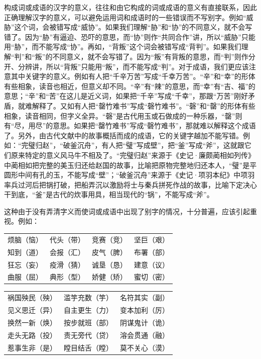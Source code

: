 构成词或成语的汉字的意义，往往和由它构成的词或成语的意义有直接联系，因此正确理解汉字的意义，可以避免运用词和成语时的一些错误而不写别字。例如“威胁”这个词，会被错写成“威协”。如果我们理解“胁”和“协”的不同意义，就不会写错了。因为“胁”有逼迫、恐吓的意思，而“协”则作“共同合作”讲，所以“威胁”只能用“胁”，而不能写成“协”。再如，“背叛”这个词会被错写成“背判”。如果我们理解“判”和“叛”的不同意义，就不会写错了。因为“叛”有背叛的意思，而“判”则作分开、分辨讲，所以“背叛”只能用“叛”，而不能写成“判”。对于成语，我们更应该注意其中关键字的意义。例如有人把“千辛万苦”写成“千幸万苦”。“辛”和“幸”的形体有些相象，读音也相近，但意义却不同。“辛”有“辣”的意思，而“幸”有“吉、福”的意思；“辛”和“苦”在这儿是近义词，如果把“千辛”写成“千幸”，那跟“万苦”刚好矛盾，就难解释了。又如有人把“罄竹难书”写成“磬竹难书”。“磬”和“罄”的形体有些相象，读音相同，但字义全异。“磬”是古代用玉或石做成的一种乐器，“罄”则有“尽，用尽”的意思。如果把“罄竹难书”写成“磬竹难书”，那就难以解释这个成语了。另外，由古代文献中的故事概括而成的成语，它的关键字越加不能写错。例如：“完璧归赵”，“破釜沉舟”，有人把“璧”写成壁”，把“釜”写成“斧”，这就跟它们原来特定的意义风马牛不相及了。“完璧归赵”来源于《史记·廉颇蔺相如列传》中蔺相如把完整的美玉归还给赵国的故事，比喻把原物完整地归还本人，“璧”是平圆形中间有孔的玉，不能写成“壁”；“破釜沉舟”来源于《史记·项羽本纪》中项羽率兵过河后把锅打破，把船弄沉以激励将士与秦兵拼死作战的故事，比喻下定决心干到底，“釜”是古代的炊事用具，相当现代的“锅”，不能写成“斧”。

这种由于没有弄清字义而使词或成语中出现了别字的情况，十分普遍，应该引起重视。例如：
\vspace{1em}

\begin{tabular}{llll}
	烦脑（恼） & 代头（带） & 竞赛（竞） & 坚巨（艰）\\
	知到（道） & 会报（汇） & 皮气（脾） & 布署（部）\\
	狂忘（妄） & 疫滑（猜） & 诚垦（恳） & 建意（议）\\
	曲服（屈） & 典形（型） & 娇健（矫） & 蜜切（密）\\
\end{tabular}

\begin{tabular}{lll}
	祸国殃民（殃） & 滥竽充数（竽） & 名符其实（副）\\
	见义思迁（异） & 自主更生（力） & 变本加利（厉）\\
	换然一新（焕） & 按步就班（部） & 阴谋鬼计（诡）\\
	走头无路（投） & 责无旁代（贷） & 溶会贯通（融）\\
	惹事生非（是） & 瞠目结舌（瞠） & 莫不关心（漠）\\
\end{tabular}
\newpage

